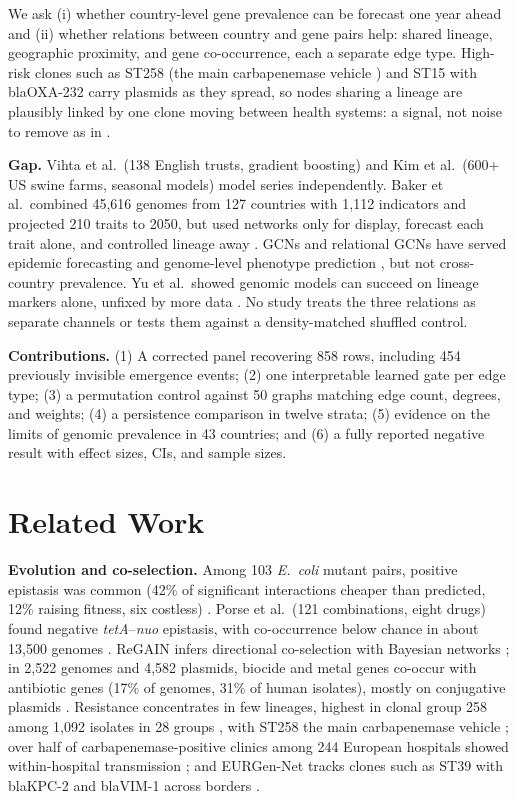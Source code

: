 \documentclass[journal]{IEEEtran}
\begin{document}
We ask (i) whether country-level gene prevalence can be forecast one year ahead and (ii) whether relations between country and gene pairs help: shared lineage, geographic proximity, and gene co-occurrence, each a separate edge type. High-risk clones such as ST258 (the main carbapenemase vehicle \cite{ref9, ref12}) and ST15 with blaOXA-232 \cite{ref11} carry plasmids as they spread, so nodes sharing a lineage are plausibly linked by one clone moving between health systems: a signal, not noise to remove as in \cite{ref18}.

\textbf{Gap.} Vihta et al.\ (138 English trusts, gradient boosting) \cite{ref17} and Kim et al.\ (600+ US swine farms, seasonal models) \cite{ref19} model series independently. Baker et al.\ combined 45,616 genomes from 127 countries with 1,112 indicators and projected 210 traits to 2050, but used networks only for display, forecast each trait alone, and controlled lineage away \cite{ref18}. GCNs \cite{ref20} and relational GCNs \cite{ref21} have served epidemic forecasting \cite{ref22} and genome-level phenotype prediction \cite{ref23}, but not cross-country prevalence. Yu et al.\ showed genomic models can succeed on lineage markers alone, unfixed by more data \cite{ref24}. No study treats the three relations as separate channels or tests them against a density-matched shuffled control.

\textbf{Contributions.} (1) A corrected panel recovering 858 rows, including 454 previously invisible emergence events; (2) one interpretable learned gate per edge type; (3) a permutation control against 50 graphs matching edge count, degrees, and weights; (4) a persistence comparison in twelve strata; (5) evidence on the limits of genomic prevalence in 43 countries; and (6) a fully reported negative result with effect sizes, CIs, and sample sizes.

\section{Related Work}
\textbf{Evolution and co-selection.} Among 103 \textit{E.\ coli} mutant pairs, positive epistasis was common (42\% of significant interactions cheaper than predicted, 12\% raising fitness, six costless) \cite{ref15}. Porse et al.\ (121 combinations, eight drugs) found negative \textit{tetA}--\textit{nuo} epistasis, with co-occurrence below chance in about 13,500 genomes \cite{ref14}. ReGAIN infers directional co-selection with Bayesian networks \cite{ref16}; in 2,522 genomes and 4,582 plasmids, biocide and metal genes co-occur with antibiotic genes (17\% of genomes, 31\% of human isolates), mostly on conjugative plasmids \cite{ref13}. Resistance concentrates in few lineages, highest in clonal group 258 among 1,092 isolates in 28 groups \cite{ref9}, with ST258 the main carbapenemase vehicle \cite{ref12}; over half of carbapenemase-positive clinics among 244 European hospitals showed within-hospital transmission \cite{ref10}; and EURGen-Net tracks clones such as ST39 with blaKPC-2 and blaVIM-1 across borders \cite{ref5}.
\end{document}

